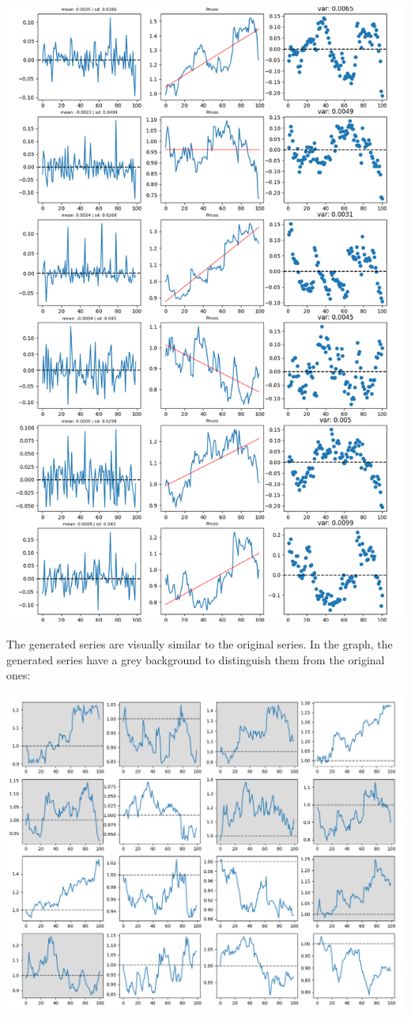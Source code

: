 \documentclass{article}
\begin{document}
    \begin{center}
        \includegraphics[scale=0.5]{imgs/results_reduced.png}
    \end{center}
    \newpage
    The generated series are visually similar to the original series. In the graph, the generated series have a grey background to distinguish them from the original ones:
    \begin{center}
        \includegraphics[scale=0.3]{imgs/series_comparison_README.png}
    \end{center}
\end{document}
